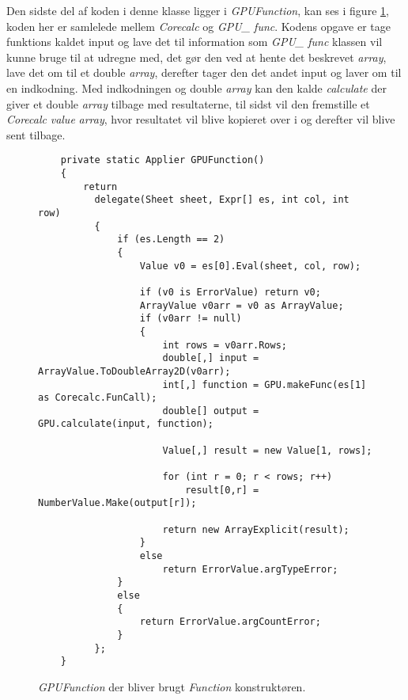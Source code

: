 Den sidste del af koden i denne klasse ligger i \textit{GPUFunction}, kan ses i figure \ref{fig:Corecalc_FC_2}, koden her er samlelede mellem \textit{Corecalc} og \textit{GPU\_ func}. Kodens opgave er tage funktions kaldet input og lave det til information som \textit{GPU\_ func} klassen vil kunne bruge til at udregne med, det gør den ved at hente det beskrevet \textit{array}, lave det om til et double \textit{array}, derefter tager den det andet input og laver om til en indkodning. Med indkodningen og double \textit{array} kan den kalde \textit{calculate} der giver et double \textit{array} tilbage med resultaterne, til sidst vil den fremstille et \textit{Corecalc} \textit{value} \textit{array}, hvor resultatet vil blive kopieret over i og derefter vil blive sent tilbage.

\begin{figure}[!ht]
    \centering
    \lstset{style=sharpc}
	\begin{lstlisting}
    private static Applier GPUFunction()
    {
        return
          delegate(Sheet sheet, Expr[] es, int col, int row)
          {
              if (es.Length == 2)
              {
                  Value v0 = es[0].Eval(sheet, col, row);
                  
                  if (v0 is ErrorValue) return v0;
                  ArrayValue v0arr = v0 as ArrayValue;
                  if (v0arr != null)
                  {
                      int rows = v0arr.Rows;
                      double[,] input = ArrayValue.ToDoubleArray2D(v0arr);
                      int[,] function = GPU.makeFunc(es[1] as Corecalc.FunCall);
                      double[] output = GPU.calculate(input, function);

                      Value[,] result = new Value[1, rows];

                      for (int r = 0; r < rows; r++)
                          result[0,r] = NumberValue.Make(output[r]);

                      return new ArrayExplicit(result);
                  }
                  else
                      return ErrorValue.argTypeError;
              }
              else
              {
                  return ErrorValue.argCountError;
              }
          };
    }
	\end{lstlisting}
    \caption{\textit{GPUFunction} der bliver brugt  \textit{Function} konstruktøren.}
    \label{fig:Corecalc_FC_2}
\end{figure}